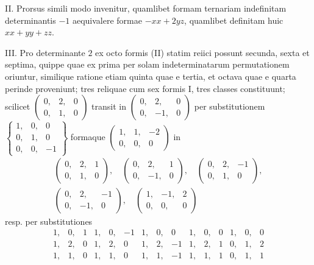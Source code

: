 II. Prorsus simili modo invenitur, quamlibet formam ternariam indefinitam determinantis \(-1\) aequivalere formae \(-xx+2yz\), quamlibet definitam huic \(xx+yy+zz\).

III. Pro determinante \(2\) ex octo formis (II) statim reiici possunt secunda, sexta et septima, quippe quae ex prima per solam indeterminatarum permutationem oriuntur, similique ratione etiam quinta quae e tertia, et octava quae e quarta perinde proveniunt; tres reliquae cum sex formis I, tres classes constituunt; scilicet \(\left(\begin{smallmatrix}0,&2,&0\\0,&1,&0\end{smallmatrix}\right)\) transit in \(\left(\begin{smallmatrix}0,&2,&0\\0,&-1,&0\end{smallmatrix}\right)\) per substitutionem \(\left\{\begin{smallmatrix}1,&0,&0\\0,&1,&0\\0,&0,&-1\end{smallmatrix}\right\}\) formaque \(\left(\begin{smallmatrix}1,&1,&-2\\0,&0,&0\end{smallmatrix}\right)\) in
\[
\begin{gathered}
\left(\begin{smallmatrix}0,&2,&1\\0,&1,&0\end{smallmatrix}\right),\quad
\left(\begin{smallmatrix}0,&2,&1\\0,&-1,&0\end{smallmatrix}\right),\quad
\left(\begin{smallmatrix}0,&2,&-1\\0,&1,&0\end{smallmatrix}\right),\\
\left(\begin{smallmatrix}0,&2,&-1\\0,&-1,&0\end{smallmatrix}\right),\quad
\left(\begin{smallmatrix}1,&-1,&2\\0,&0,&0\end{smallmatrix}\right)
\end{gathered}
\]
resp. per substitutiones
\[
\begin{array}{rrr|rrr|rrr|rrr|rrr}
1,&0,&1&1,&0,&-1&1,&0,&0&1,&0,&0&1,&0,&0\\
1,&2,&0&1,&2,&0&1,&2,&-1&1,&2,&1&0,&1,&2\\
1,&1,&0&1,&1,&0&1,&1,&-1&1,&1,&1&0,&1,&1
\end{array}
\]
